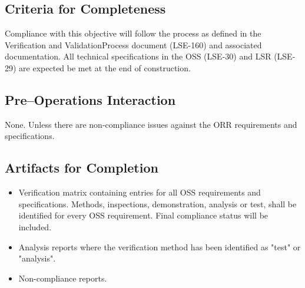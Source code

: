 \subsection{Criteria for Completeness}
Compliance with this objective will follow the process as defined in the Verification and ValidationProcess document (LSE-160) and associated documentation.   All technical specifications in the OSS (LSE-30) and LSR (LSE-29) are expected be met at the end of construction.

\subsection{Pre--Operations Interaction}
None.  Unless there are non-compliance issues against the ORR requirements and specifications.

\subsection{Artifacts for Completion}

\begin{itemize}
 
	\item Verification matrix containing entries for all OSS requirements and specifications.  Methods, inspections, demonstration, analysis or test, shall be identified for every OSS requirement.  Final compliance status will be included.

	\item Analysis reports where the verification method has been identified as "test" or "analysis".
	\item Non-compliance reports.

\end{itemize}
